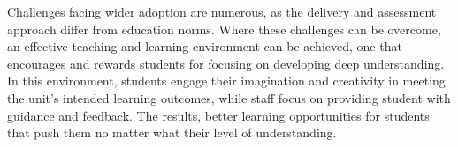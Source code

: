 Challenges facing wider adoption are numerous, as the delivery and assessment approach differ from education norms. Where these challenges can be overcome, an effective teaching and learning environment can be achieved, one that encourages and rewards students for focusing on developing deep understanding. In this environment, students engage their imagination and creativity in meeting the unit's intended learning outcomes, while staff focus on providing student with guidance and feedback. The results, better learning opportunities for students that push them no matter what their level of understanding.





















